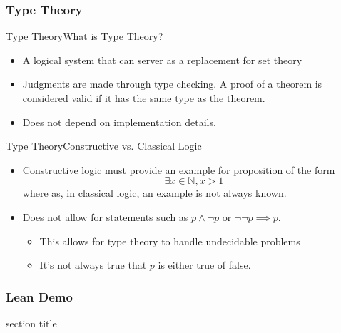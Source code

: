 \documentclass[usenames,dvipsnames,aspectratio=169]{beamer}
\newcommand{\N}{\mathbb{N}}
\begin{document}
\subsubsection{Type Theory}
\begin{frame}{Type Theory}{What is Type Theory?}
    \begin{itemize}
        \item A logical system that can server as a replacement for set theory
        \item Judgments are made through type checking. A proof of a theorem is
            considered valid if it has the same type as the theorem.
        \item Does not depend on implementation details. 
    \end{itemize}
\end{frame}

\begin{frame}{Type Theory}{Constructive vs. Classical Logic}
    \begin{itemize}
        \item Constructive logic must provide an example for proposition of the
            form
            $$
                \exists x \in \N, x > 1
            $$
            where as, in classical logic, an example is not always known.

        \item Does not allow for statements such as $p \land \lnot p$ or $\lnot \lnot p \implies p$.
            \begin{itemize}
                \item This allows for type theory to handle undecidable problems
                \item It's not always true that $p$ is either true of false.
            \end{itemize}
    \end{itemize}

\end{frame}

\subsubsection{Lean Demo}
\begin{frame}
    \begingroup
    \begin{beamercolorbox}[sep=12pt,center]{section title}
    \end{beamercolorbox}
    \endgroup
\end{frame}
\end{document}
